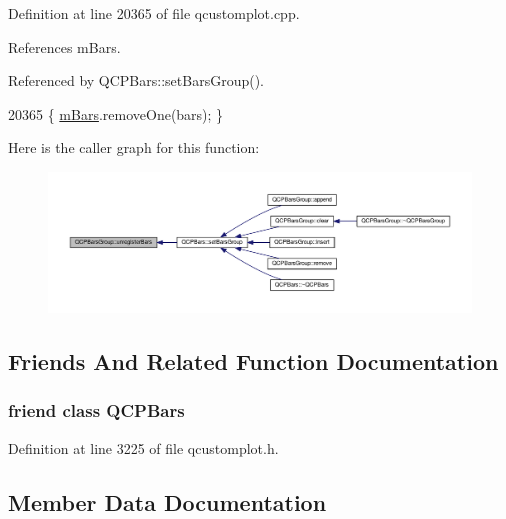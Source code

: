Definition at line 20365 of file qcustomplot.\+cpp.



References m\+Bars.



Referenced by Q\+C\+P\+Bars\+::set\+Bars\+Group().


\begin{DoxyCode}
20365 \{ \hyperlink{class_q_c_p_bars_group_aa5affa0639c13e05bda9d23f16dd1393}{mBars}.removeOne(bars); \}
\end{DoxyCode}


Here is the caller graph for this function\+:\nopagebreak
\begin{figure}[H]
\begin{center}
\leavevmode
\includegraphics[width=350pt]{class_q_c_p_bars_group_ac7073cdd7b1a40c6cb4b5f908145f8c4_icgraph}
\end{center}
\end{figure}




\subsection{Friends And Related Function Documentation}
\hypertarget{class_q_c_p_bars_group_a721b87c7cdb8e83a90d77fc8a22e7195}{}
\subsubsection[{Q\+C\+P\+Bars}]{\setlength{\rightskip}{0pt plus 5cm}friend class {\bf Q\+C\+P\+Bars}\hspace{0.3cm}{\ttfamily [friend]}}\label{class_q_c_p_bars_group_a721b87c7cdb8e83a90d77fc8a22e7195}


Definition at line 3225 of file qcustomplot.\+h.



\subsection{Member Data Documentation}
\hypertarget{class_q_c_p_bars_group_aa5affa0639c13e05bda9d23f16dd1393}{}
